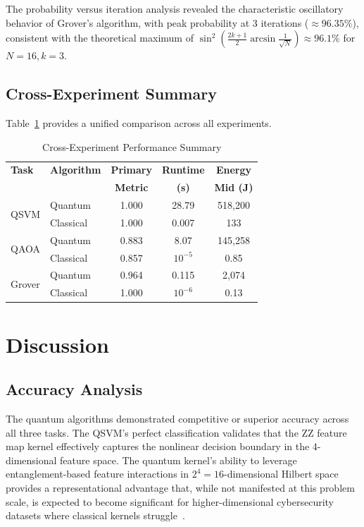 \documentclass[conference]{IEEEtran}
\begin{document}
The probability versus iteration analysis revealed the characteristic oscillatory behavior of Grover's algorithm, with peak probability at 3 iterations ($\approx 96.35\%$), consistent with the theoretical maximum of $\sin^2\left(\frac{2k+1}{2}\arcsin\frac{1}{\sqrt{N}}\right) \approx 96.1\%$ for $N=16, k=3$.

\subsection{Cross-Experiment Summary}

Table~\ref{tab:summary} provides a unified comparison across all experiments.

\begin{table}[htbp]
\caption{Cross-Experiment Performance Summary}
\label{tab:summary}
\centering
\begin{tabular}{llccc}
\toprule
\textbf{Task} & \textbf{Algorithm} & \textbf{Primary} & \textbf{Runtime} & \textbf{Energy} \\
 & & \textbf{Metric} & \textbf{(s)} & \textbf{Mid (J)} \\
\midrule
\multirow{2}{*}{QSVM} & Quantum & 1.000 & 28.79 & 518,200 \\
 & Classical & 1.000 & 0.007 & 133 \\
\midrule
\multirow{2}{*}{QAOA} & Quantum & 0.883 & 8.07 & 145,258 \\
 & Classical & 0.857 & $10^{-5}$ & 0.85 \\
\midrule
\multirow{2}{*}{Grover} & Quantum & 0.964 & 0.115 & 2,074 \\
 & Classical & 1.000 & $10^{-6}$ & 0.13 \\
\bottomrule
\end{tabular}
\end{table}

\section{Discussion}

\subsection{Accuracy Analysis}

The quantum algorithms demonstrated competitive or superior accuracy across all three tasks. The QSVM's perfect classification validates that the ZZ feature map kernel effectively captures the nonlinear decision boundary in the 4-dimensional feature space. The quantum kernel's ability to leverage entanglement-based feature interactions in $2^4 = 16$-dimensional Hilbert space provides a representational advantage that, while not manifested at this problem scale, is expected to become significant for higher-dimensional cybersecurity datasets where classical kernels struggle~\cite{liu2021rigorous}.
\end{document}
